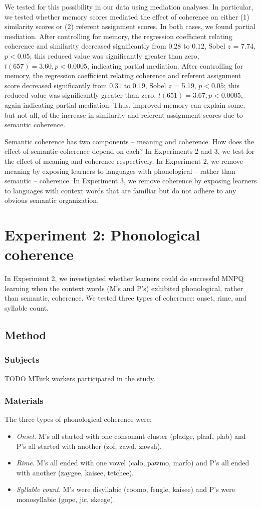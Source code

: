 \documentclass[man,floatsintext]{apa6}
\begin{document}
We tested for this possibility in our data using mediation analyses. In particular, we tested whether memory scores mediated the effect of coherence on either (1) similarity scores or (2) referent assignment scores. In both cases, we found partial mediation. After controlling for memory, the regression coefficient relating coherence and similarity decreased significantly from $0.28$ to $0.12$, Sobel $z$ = 7.74, $p < 0.05$; this reduced value was significantly greater than zero, $t(657) = 3.60, p < 0.0005$, indicating partial mediation. After controlling for memory, the regression coefficient relating coherence and referent assignment score decreased significantly from $0.31$ to $0.19$, Sobel $z$ = 5.19, $p < 0.05$; this reduced  value was significantly greater than zero, $t(651) = 3.67, p < 0.0005$, again indicating partial mediation. Thus, improved memory can explain some, but not all, of the increase in similarity and referent assignment scores due to semantic coherence.

Semantic coherence has two components -- meaning and coherence. How does the effect of semantic coherence depend on each? In Experiments 2 and 3, we test for the effect of meaning and coherence respectively. In Experiment 2, we remove meaning by exposing learners to languages with phonological -- rather than semantic -- coherence. In Experiment 3, we remove coherence by exposing learners to languages with context words that are familiar but do not adhere to any obvious semantic organization.

\section{Experiment 2: Phonological coherence}

In Experiment 2, we investigated whether learners could do successful MNPQ learning when the context words (M's and P's) exhibited phonological, rather than semantic, coherence. We tested three types of coherence: onset, rime, and syllable count.

\subsection{Method}
\subsubsection{Subjects} TODO MTurk workers participated in the study.
\subsubsection{Materials}
The three types of phonological coherence were:
\begin{itemize}
\item \emph{Onset}. M's all started with one consonant cluster (pladge, plaaf, plab) and P's all started with another (zof, zawd, zawsh).
\item \emph{Rime}. M's all ended with one vowel (calo, pawmo, marfo) and P's all ended with another (zaygee, kaisee, tetchee).
\item \emph{Syllable count}. M's were disyllabic (coomo, fengle, kaisee) and P's were monosyllabic (gope, jic, skeege).
\end{itemize} 
\end{document}
